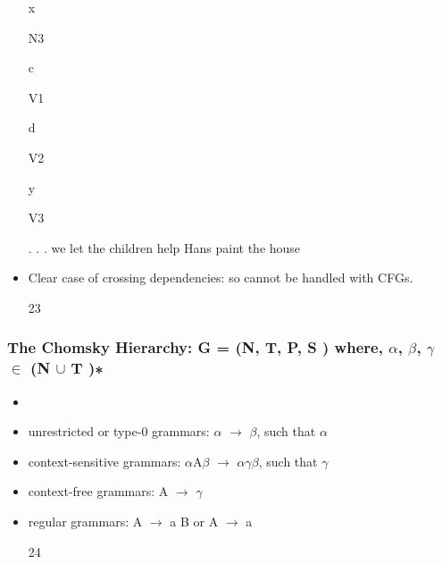 \documentclass[compress,color=usenames]{beamer}
\begin{document}
\begin{frame}
\begin{itemize}
x


N3





c


V1





d


V2





y


V3





. . . we let the children help Hans paint the house





\item Clear case of crossing dependencies: so cannot be handled with CFGs.


23




\end{itemize}

\end{frame}

\begin{frame}
\frametitle{The Chomsky Hierarchy: G = (N, T, P, S ) where, $\alpha$, $\beta$, $\gamma$ $\in$ (N $\cup$ T )∗}

\begin{itemize}
\item




\item unrestricted or type-0 grammars: $\alpha$ $\rightarrow$ $\beta$, such that $\alpha$





\item context-sensitive grammars: $\alpha$A$\beta$ $\rightarrow$ $\alpha$$\gamma$$\beta$, such that $\gamma$





\item context-free grammars: A $\rightarrow$ $\gamma$





\item regular grammars: A $\rightarrow$ a B or A $\rightarrow$ a





24




\end{itemize}

\end{frame}
\end{document}
